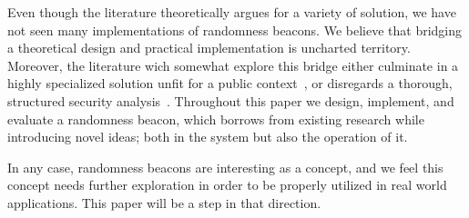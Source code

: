 Even though the literature theoretically argues for a variety of solution, we have not seen many implementations of randomness beacons.
We believe that bridging a theoretical design and practical implementation is uncharted territory.
Moreover, the literature wich somewhat explore this bridge either culminate in a highly specialized solution unfit for a public context~\cite{cascudo2017scrape, syta2017scalable}, or disregards a thorough, structured security analysis~\cite{bunz2017proofsof}.
Throughout this paper we design, implement, and evaluate a randomness beacon, which borrows from existing research while introducing novel ideas; both in the system but also the operation of it.

In any case, randomness beacons are interesting as a concept, and we feel this concept needs further exploration in order to be properly utilized in real world applications. This paper will be a step in that direction.
